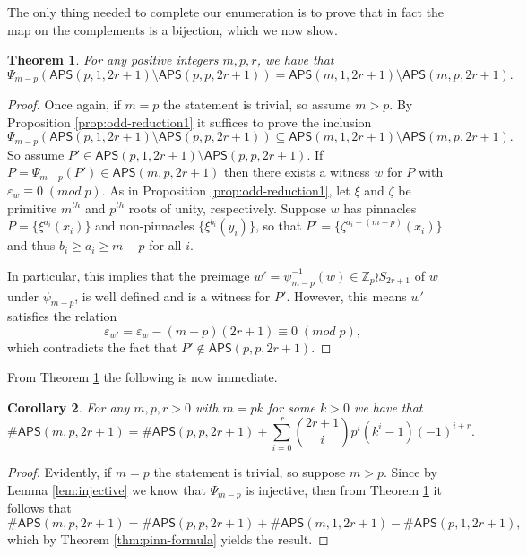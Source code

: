 \documentclass[12pt,reqno]{amsart}
\numberwithin{equation}{section}
\theoremstyle{plain}
\newtheorem{theorem}{Theorem}[section]
\newtheorem{corollary}[theorem]{Corollary}
\theoremstyle{definition}
\theoremstyle{remark}
\newcommand{\Z}{\mathbb{Z}}
\newcommand\APS{\mathsf{APS}}
\begin{document}
The only thing needed to complete our enumeration is to prove that in fact the map on the complements is a bijection, which we now show.

\begin{theorem}\label{thm:odd-reduction}
For any positive integers $m,p,r$, we have that 
\[\Psi_{m-p}(\APS(p,1,2r+1) \setminus \APS(p,p,2r+1)) = \APS(m,1,2r+1) \setminus \APS(m,p,2r+1).\]
\end{theorem}

\begin{proof}
Once again, if $m=p$ the statement is trivial, so assume $m>p$.
    By Proposition \ref{prop:odd-reduction1} it suffices to prove the inclusion 
    \[\Psi_{m-p}(\APS(p,1,2r+1) \setminus \APS(p,p,2r+1)) \subseteq \APS(m,1,2r+1) \setminus \APS(m,p,2r+1).\]
So assume $P' \in \APS(p,1,2r+1) \setminus \APS(p,p,2r+1)$. If $P = \Psi_{m-p}(P') \in \APS(m,p,2r+1)$ then there exists a witness $w$ for $P$ with $\varepsilon_w \equiv 0 \;(mod \;p)$. As in Proposition 
\ref{prop:odd-reduction1}, let $\xi$ and $\zeta$ be primitive $m^{th}$ and $p^{th}$ roots of unity, respectively. 
Suppose $w$ has pinnacles $P = \{\xi^{a_i}(x_i)\}$ and non-pinnacles $\{ \xi^{b_i}(y_i)\}$, so that $P' = \{ \zeta^{a_i-(m-p)}(x_i)\}$ and thus $b_i \geq a_i \geq m-p$ for all $i$.

In particular, this implies that the preimage $w'  = \psi_{m-p}^{-1}(w)\in \Z_p \wr S_{2r+1}$ of $w$ under $\psi_{m-p}$, is well defined and is a witness for $P'$. However, this means $w'$ satisfies the relation 
\[
\varepsilon_{w'}=\varepsilon_w - (m-p)(2r+1) \equiv 0 \; (mod \; p),
\]
 which contradicts the fact that $P' \notin \APS(p,p,2r+1)$.  
\end{proof}

From Theorem \ref{thm:odd-reduction} the following is now immediate. 

\begin{corollary}\label{cor:reduction}
For any $m,p,r>0$ with $m=pk$ for some $k>0$ we have that 
\[\#\APS(m,p,2r+1) = \#\APS(p,p,2r+1) + \sum_{i=0}^r\binom{2r+1}{i}p^i(k^i-1)(-1)^{i+r}.\]
\end{corollary}

\begin{proof}
Evidently, if $m=p$ the statement is trivial, so suppose $m>p$.
    Since by Lemma \ref{lem:injective} we know that $\Psi_{m-p}$ is injective, then from Theorem \ref{thm:odd-reduction} it follows that 
    \[
    \# \APS(m,p,2r+1) =\#\APS(p,p,2r+1)+\#\APS(m,1,2r+1)-\#\APS(p,1,2r+1),\]
    which by Theorem \ref{thm:pinn-formula} yields the result.
\end{proof}
\end{document}
